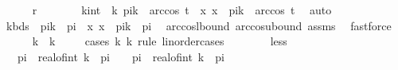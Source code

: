 \begin{isabellebody}
\isanewline
\ \ \ \ \isamarkupfalse%
\ {\isachardoublequoteopen}{\isacharquery}{\kern0pt}r{\isachardoublequoteclose}\isanewline
\ \ \ \ \isamarkupfalse%
\ \isamarkupfalse%
\ k{\isacharprime}{\kern0pt}{\isacharcolon}{\kern0pt}{\isacharcolon}{\kern0pt}int\ \ k{\isacharprime}{\kern0pt}{\isacharcolon}{\kern0pt}\ {\isachardoublequoteopen}{}{\isacharasterisk}{\kern0pt}pi{\isacharasterisk}{\kern0pt}k{\isacharprime}{\kern0pt}\ {\isacharminus}{\kern0pt}\ arccos\ t\ {\isacharless}{\kern0pt}\ x{\isachardoublequoteclose}\ {\isachardoublequoteopen}x\ {\isacharless}{\kern0pt}\ {}{\isacharasterisk}{\kern0pt}pi{\isacharasterisk}{\kern0pt}k{\isacharprime}{\kern0pt}\ {\isacharplus}{\kern0pt}\ arccos\ t{\isachardoublequoteclose}\ \isamarkupfalse%
\ auto\isanewline
\ \ \ \ \isamarkupfalse%
\ k{\isacharprime}{\kern0pt}bds{\isacharcolon}{\kern0pt}\ \ {\isachardoublequoteopen}{}{\isacharasterisk}{\kern0pt}pi{\isacharasterisk}{\kern0pt}k{\isacharprime}{\kern0pt}\ {\isacharminus}{\kern0pt}\ pi\ {\isacharless}{\kern0pt}\ x{\isachardoublequoteclose}\ {\isachardoublequoteopen}x\ {\isacharless}{\kern0pt}\ {}{\isacharasterisk}{\kern0pt}pi{\isacharasterisk}{\kern0pt}k{\isacharprime}{\kern0pt}\ {\isacharplus}{\kern0pt}\ pi{\isachardoublequoteclose}\ \isamarkupfalse%
\ arccos{\isacharunderscore}{\kern0pt}lbound\ arccos{\isacharunderscore}{\kern0pt}ubound\ assms\ \isamarkupfalse%
\ fastforce{\isacharplus}{\kern0pt}\isanewline
\ \ \ \ \isamarkupfalse%
\ {\isachardoublequoteopen}k{\isacharprime}{\kern0pt}\ {\isacharequal}{\kern0pt}\ k{\isachardoublequoteclose}\isanewline
\ \ \ \ \isamarkupfalse%
{\isacharparenleft}{\kern0pt}cases\ k{\isacharprime}{\kern0pt}\ k\ rule{\isacharcolon}{\kern0pt}\ linorder{\isacharunderscore}{\kern0pt}cases{\isacharparenright}{\kern0pt}\isanewline
\ \ \ \ \ \ \isamarkupfalse%
\ less\isanewline
\ \ \ \ \ \ \isamarkupfalse%
\ {\isachardoublequoteopen}{}\ {\isacharasterisk}{\kern0pt}\ pi\ {\isacharasterisk}{\kern0pt}\ real{\isacharunderscore}{\kern0pt}of{\isacharunderscore}{\kern0pt}int\ k\ {\isacharminus}{\kern0pt}\ pi\ {\isacharless}{\kern0pt}\ {}\ {\isacharasterisk}{\kern0pt}\ pi\ {\isacharasterisk}{\kern0pt}\ real{\isacharunderscore}{\kern0pt}of{\isacharunderscore}{\kern0pt}int\ k{\isacharprime}{\kern0pt}\ {\isacharplus}{\kern0pt}\ pi{\isachardoublequoteclose}\ \isamarkupfalse%

\end{isabellebody}
